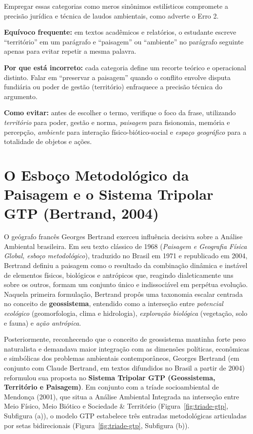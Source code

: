 Empregar essas categorias como meros sinônimos estilísticos compromete a precisão jurídica e técnica de laudos ambientais, como adverte o Erro 2.

\begin{boxErro}
\textbf{Equívoco frequente:} em textos acadêmicos e relatórios, o estudante escreve ``território'' em um parágrafo e ``paisagem'' ou ``ambiente'' no parágrafo seguinte apenas para evitar repetir a mesma palavra.

\textbf{Por que está incorreto:} cada categoria define um recorte teórico e operacional distinto. Falar em ``preservar a paisagem'' quando o conflito envolve disputa fundiária ou poder de gestão (território) enfraquece a precisão técnica do argumento.

\textbf{Como evitar:} antes de escolher o termo, verifique o foco da frase, utilizando \textit{território} para poder, gestão e norma, \textit{paisagem} para fisionomia, memória e percepção, \textit{ambiente} para interação físico-biótico-social e \textit{espaço geográfico} para a totalidade de objetos e ações.
\end{boxErro}

\section{O Esboço Metodológico da Paisagem e o Sistema Tripolar GTP (Bertrand, 2004)}

O geógrafo francês Georges Bertrand exerceu influência decisiva sobre a Análise Ambiental brasileira. Em seu texto clássico de 1968 (\textit{Paisagem e Geografia Física Global, esboço metodológico}), traduzido no Brasil em 1971 e republicado em 2004, Bertrand definiu a paisagem como o resultado da combinação dinâmica e instável de elementos físicos, biológicos e antrópicos que, reagindo dialeticamente uns sobre os outros, formam um conjunto único e indissociável em perpétua evolução. Naquela primeira formulação, Bertrand propôs uma taxonomia escalar centrada no conceito de \textbf{geossistema}, entendido como a interseção entre \textit{potencial ecológico} (geomorfologia, clima e hidrologia), \textit{exploração biológica} (vegetação, solo e fauna) e \textit{ação antrópica}.

Posteriormente, reconhecendo que o conceito de geossistema mantinha forte peso naturalista e demandava maior integração com as dimensões políticas, econômicas e simbólicas dos problemas ambientais contemporâneos, Georges Bertrand (em conjunto com Claude Bertrand, em textos difundidos no Brasil a partir de 2004) reformulou sua proposta no \textbf{Sistema Tripolar GTP (Geossistema, Território e Paisagem)}. Em conjunto com a tríade socioambiental de Mendonça (2001), que situa a Análise Ambiental Integrada na interseção entre Meio Físico, Meio Biótico e Sociedade \& Território (Figura~\ref{fig:triade-gtp}, Subfigura (a)), o modelo GTP estabelece três entradas metodológicas articuladas por setas bidirecionais (Figura~\ref{fig:triade-gtp}, Subfigura (b)).

